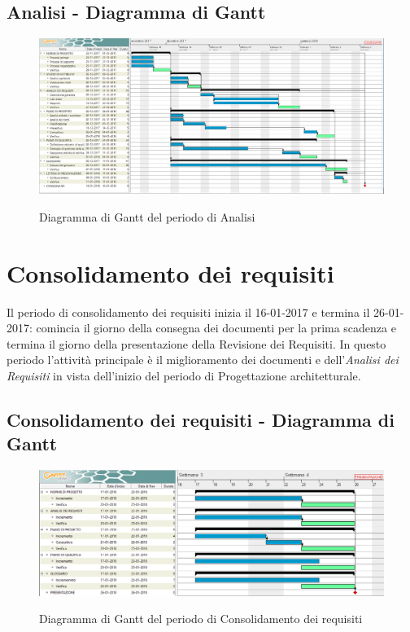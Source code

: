 \documentclass[PianoDiProgetto.tex]{subfiles}
\begin{document}
\begin{landscape}
	\subsection{Analisi - Diagramma di Gantt}
	\begin{figure}[ht]	
		\includegraphics[width=20.5cm]{images/gantt/analisi.png}
		\label{fig:foo}
		\caption{Diagramma di Gantt del periodo di Analisi}		
	\end{figure}			
\end{landscape}	

\section{Consolidamento dei requisiti}
Il periodo di consolidamento dei requisiti inizia il 16-01-2017 e termina il 26-01-2017: comincia il giorno della consegna dei documenti per la prima scadenza e termina il giorno della presentazione della Revisione dei Requisiti. In questo periodo l'attività principale è il miglioramento dei documenti e dell'\textit{Analisi dei Requisiti} in vista dell'inizio del periodo di Progettazione architetturale.
\subsection{Consolidamento dei requisiti - Diagramma di Gantt}
\begin{figure}[ht]
	\includegraphics[width=14.5cm]{images/gantt/consolidamento.png}
	\label{fig:foo}
	\caption{Diagramma di Gantt del periodo di Consolidamento dei requisiti}
\end{figure}		
\end{document}
